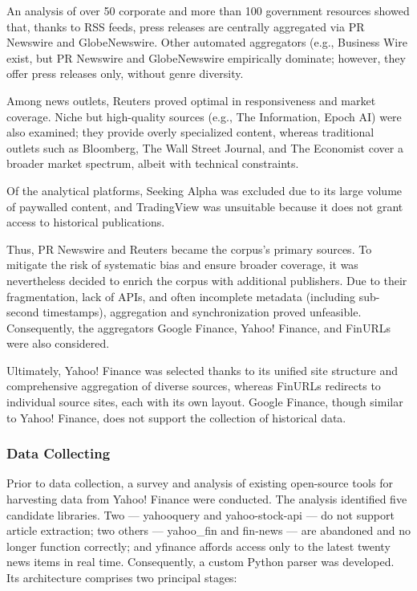 An analysis of over 50 corporate and more than 100 government resources showed that, thanks to RSS feeds, press
releases are centrally aggregated via PR Newswire and
GlobeNewswire. Other automated aggregators
(e.g., Business Wire exist, but PR Newswire and GlobeNewswire
empirically dominate; however, they offer press releases only, without genre diversity.

Among news outlets, Reuters proved optimal in responsiveness and market coverage. Niche but high-quality sources
(e.g., The Information, Epoch AI)
were also examined; they provide overly specialized content, whereas traditional outlets
such as Bloomberg, The Wall Street Journal,
and The Economist cover a broader market spectrum, albeit with
technical constraints.

Of the analytical platforms, Seeking Alpha was excluded due to its large volume of paywalled content, and TradingView
was unsuitable because it does not grant access to historical publications.

Thus, PR Newswire and Reuters became the corpus's primary sources. To mitigate the risk of systematic bias and ensure
broader coverage, it was nevertheless decided to enrich the corpus with additional publishers. Due to their fragmentation,
lack of APIs, and often incomplete metadata (including sub-second timestamps), aggregation and synchronization proved
unfeasible. Consequently, the aggregators Google Finance,
Yahoo! Finance, and FinURLs were also considered.

Ultimately, Yahoo! Finance was selected thanks to its unified site structure and comprehensive aggregation of diverse
sources, whereas FinURLs redirects to individual source sites, each with its own layout. Google Finance, though similar
to Yahoo! Finance, does not support the collection of historical data.

\subsubsection{Data Collecting}
\label{sec:data_collecting}

Prior to data collection, a survey and analysis of existing open-source tools for harvesting data from Yahoo! Finance were conducted.
The analysis identified five candidate libraries. Two --- yahooquery and yahoo-stock-api --- do not support article extraction;
two others --- yahoo\_fin and fin-news --- are abandoned and no longer function correctly; and yfinance affords access only
to the latest twenty news items in real time. Consequently, a custom Python parser was developed. Its architecture comprises
two principal stages:

